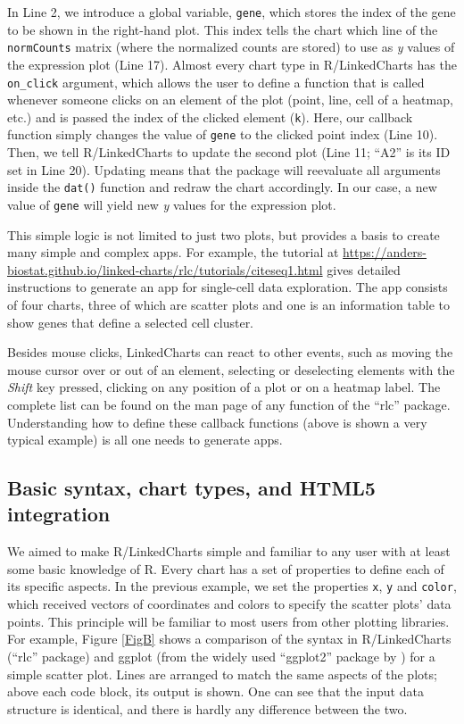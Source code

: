 \documentclass[twocolumn,10pt]{article}
\begin{document}
In Line 2, we introduce a global variable, \texttt{gene}, which stores the index of the gene to be shown in the right-hand plot. This index tells the chart which line of the \texttt{normCounts} matrix (where the normalized counts are stored) to use as \emph{y} values of the expression plot (Line 17). Almost every chart type in R/LinkedCharts has the \texttt{on_click} argument, which allows the user to define a function that is called whenever someone clicks on an element of the plot (point, line, cell of a heatmap, etc.) and is passed the index of the clicked element (\texttt{k}).  Here, our callback function simply changes the value of \texttt{gene} to the clicked point index (Line 10). Then, we tell R/LinkedCharts to update the second plot (Line 11; ``A2'' is its ID set in Line 20). Updating means that the package will reevaluate all arguments inside the \texttt{dat()} function and redraw the chart accordingly. In our case, a new value of \texttt{gene} will yield new \emph{y} values for the expression plot.

This simple logic is not limited to just two plots, but provides a basis to create many simple and complex apps. For example, the tutorial at \url{https://anders-biostat.github.io/linked-charts/rlc/tutorials/citeseq1.html} gives detailed instructions to generate an app for single-cell data exploration. The app consists of four charts, three of which are scatter plots and one is an information table to show genes that define a selected cell cluster.

Besides mouse clicks, LinkedCharts can react to other events, such as moving the mouse cursor over or out of an element, selecting or deselecting elements with the \emph{Shift} key pressed, clicking on any position of a plot or on a heatmap label. The complete list can be found on the man page of any function of the ``rlc'' package. Understanding how to define these callback functions (above is shown a very typical example) is all one needs to generate apps. 

\subsection{Basic syntax, chart types, and HTML5 integration}

We aimed to make R/LinkedCharts simple and familiar to any user with at least some basic knowledge of R. Every chart has a set of properties to define each of its specific aspects. In the previous example, we set the properties \texttt{x}, \texttt{y} and \texttt{color}, which received vectors of coordinates and colors to specify the scatter plots' data points. This principle will be familiar to most users from other plotting libraries. For example, Figure \ref{FigB} shows a comparison of the syntax in R/LinkedCharts (``rlc'' package) and ggplot (from the widely used ``ggplot2'' package by \citet{wickham_2016}) for a simple scatter plot. Lines are arranged to match the same aspects of the plots; above each code block, its output is shown. One can see that the input data structure is identical, and there is hardly any difference between the two.
\end{document}
